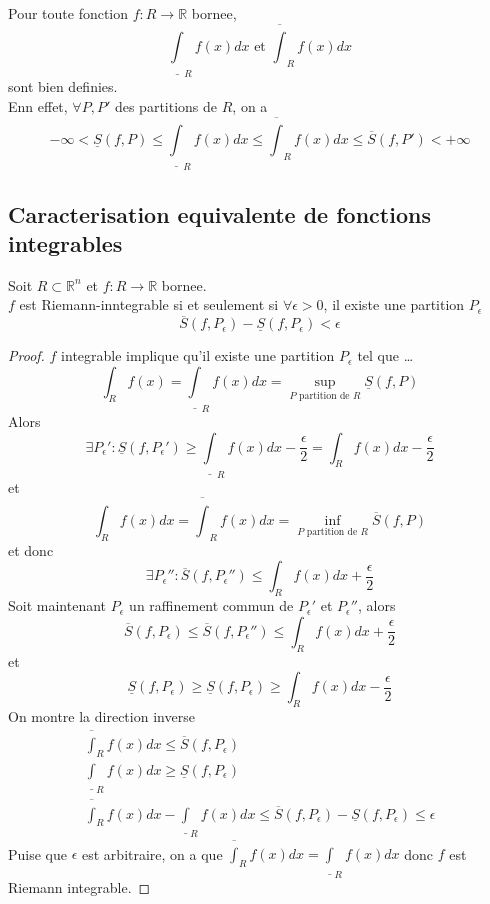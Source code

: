 \documentclass[../main.tex]{subfiles}
\begin{document}
\begin{rmq}
Pour toute fonction $f: R \to \mathbb{R}$ bornee,
\[ 
	\underline { \int } _R f( x) dx \text{ et } \overline{\int }_R f( x)  dx
\]
sont bien definies.\\
Enn effet, $\forall P,P'$ des partitions de $R$, on a 
\[ 
	- \infty  <\underline { S} ( f,P) \leq  \underline {\int}_R f( x) dx \leq  \overline{\int}_R f( x) dx \leq \overline{S}( f,P')  < + \infty 
\]

\end{rmq}
\subsection{Caracterisation equivalente de fonctions integrables}
\begin{lemma}
Soit $R \subset \mathbb{R}^n$ et $f: R \to \mathbb{R}$ bornee.\\
$f$ est Riemann-inntegrable si et seulement si $\forall \epsilon >0$, il existe une partition $P_\epsilon$ 
\[ 
	\overline{S}( f,P_\epsilon)  - \underline { S} ( f,P_\epsilon) < \epsilon
\]

\end{lemma}
\begin{proof}
$f$ integrable implique qu'il existe une partition $P_\epsilon$ tel que \ldots\\
\[ 
	\int_R f( x) = \underline { \int } _R f( x) dx = \sup_{P \text{ partition de } R} \underline{S} ( f,P) 
\]
Alors
\[ 
	\exists P_\epsilon ' : \underline { S} ( f,P_\epsilon' ) \geq \underline { \int } _R f( x) dx - \frac{\epsilon}{2}= \int_R f( x) dx - \frac{\epsilon}{2}
\]
et 
\[ 
	\int_R f( x) dx = \overline { \int } _R f( x) dx = \inf_{ P \text{ partition de  } R} \overline { S} ( f,P) 
\]
et donc 
\[ 
	\exists P_\epsilon'' : \overline { S} ( f,P_\epsilon'') \leq  \int_R f( x) dx + \frac{\epsilon}{2}
\]
Soit maintenant $P_\epsilon$ un raffinement commun de $P_\epsilon'$ et $P_\epsilon''$, alors
\[ 
	\overline { S} ( f,P_\epsilon) \leq  \overline { S} ( f,P_\epsilon'') \leq \int_R f( x) dx + \frac{\epsilon}{2}		
\]
et
\[ 
	\underline { S} ( f,P_\epsilon) \geq \underline { S} ( f,P_\epsilon)  \geq  \int_R f( x) dx - \frac{\epsilon}{2}
\]
On montre la direction inverse\\
\begin{align*}
	\overline { \int } _R f( x)  dx \leq  \overline{S}( f,P_\epsilon) \\
	\underline { \int } _Rf( x) dx \geq  \underline { S} ( f,P_\epsilon) \\
	\overline { \int } _R f( x) dx - \underline { \int } _R f( x) dx \leq  \overline { S} ( f,P_\epsilon) - \underline { S} ( f,P_\epsilon) \leq  \epsilon
\end{align*}
Puise que $\epsilon$ est arbitraire, on a que $\overline { \int } _R f( x) dx = \underline { \int } _R f( x) dx$ donc $f$ est Riemann integrable.
\end{proof}
\end{document}
